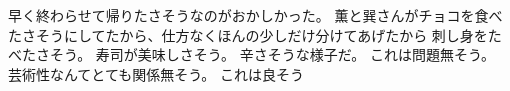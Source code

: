 早く終わらせて帰りたさそうなのがおかしかった。
薫と巽さんがチョコを食べたさそうにしてたから、仕方なくほんの少しだけ分けてあげたから
刺し身をたべたさそう。
寿司が美味しさそう。
辛さそうな様子だ。
これは問題無そう。
芸術性なんてとても関係無そう。
これは良そう
